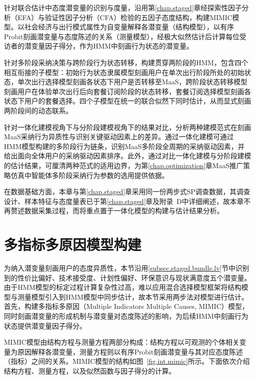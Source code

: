 针对联合估计中态度潜变量的识别与度量，沿用第\ref{chap.staged}章经探索性因子分析（EFA）与验证性因子分析（CFA）检验的五因子态度结构，构建MIMIC模型。以社会经济与出行模式属性为自变量解释各潜变量（结构模型），以有序Probit刻画潜变量与态度陈述的关系（测量模型），经极大似然估计后计算每位受访者的潜变量因子得分，作为HMM中刻画行为状态的潜变量。

针对多阶段采纳决策与跨阶段行为状态转移，构建贯穿两阶段的HMM，包含四个相互衔接的子模型：初始行为状态隶属模型刻画用户在单次出行阶段所处的初始状态，单次出行选择模型刻画各状态下用户是否转移至MaaS，跨阶段状态转移模型刻画用户在体验单次出行后向套餐订阅阶段的状态转移，套餐订阅选择模型刻画各状态下用户的套餐选择。四个子模型在统一的联合似然下同时估计，从而显式刻画两阶段间的动态联系。

针对一体化建模视角下与分阶段建模视角下的结果对比，分析两种建模范式在刻画MaaS采纳行为异质性与识别关键驱动因素上的差异。通过一体化建模可通过HMM模型构建的多阶段行为链条，识别MaaS多阶段全周期的采纳驱动因素，并给出面向全体用户的采纳驱动因素排序。此外，通过对比一体化建模与分阶段建模的估计结果，可厘清两种范式的适用边界，为第\ref{chap.optimization}章MaaS推广策略仿真中智能体多阶段采纳行为参数的选用提供依据。

在数据基础方面，本章与第\ref{chap.staged}章采用同一份两步式SP调查数据，其调查设计、样本特征与态度量表已于第\ref{chap.staged}章及附录~D中详细阐述，故本章不再赘述数据采集过程，而将重点置于一体化模型的构建与估计结果分析。

\section{多指标多原因模型构建}\label{sec.int.mimic}

为纳入潜变量刻画用户的态度异质性，本节沿用\ref{subsec.staged.bundle.lv}节中识别到的性价比偏好、技术接受度、计划性偏好、环保意识与现状满意度五个潜变量。由于HMM模型的标定过程计算复杂性过高，难以应用混合选择模型框架将结构模型与测量模型引入到HMM模型中同步估计，故本节采用两步法对模型进行估计。首先，构建多指标多原因（Multiple Indicators Multiple Causes, MIMIC）模型，同时刻画潜变量的形成机制与潜变量对态度陈述的影响\citep{joreskogEstimationModelMultiple1975}，为后续HMM中刻画行为状态提供潜变量因子得分。

MIMIC模型由结构方程与测量方程两部分构成\citep{joreskogEstimationModelMultiple1975}：结构方程以可观测的个体相关变量为原因解释各潜变量，测量方程则以有序Probit刻画潜变量与其对应态度陈述（指标）之间的关系。MIMIC模型的结构如图~\ref{fig.int.mimic}所示。下面依次介绍结构方程、测量方程，以及似然函数与因子得分的计算。

